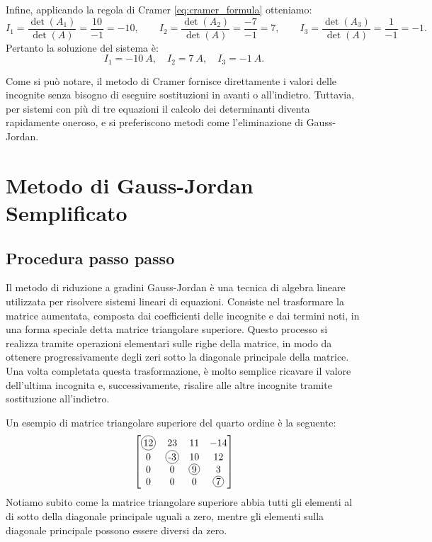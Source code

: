 Infine, applicando la regola di Cramer \eqref{eq:cramer_formula} otteniamo:
\begin{equation}
I_1 = \frac{\det(A_1)}{\det(A)} = \frac{10}{-1} = -10,\qquad
I_2 = \frac{\det(A_2)}{\det(A)} = \frac{-7}{-1} = 7,\qquad
I_3 = \frac{\det(A_3)}{\det(A)} = \frac{1}{-1} = -1. \label{eq:soluzione_3x3}
\end{equation}
Pertanto la soluzione del sistema è:
\begin{equation}
I_1 = \SI{-10}{A},\quad I_2 = \SI{7}{A},\quad I_3 = \SI{-1}{A}. \label{eq:soluzione_3x2_valori}
\end{equation}

Come si può notare, il metodo di Cramer fornisce direttamente i valori delle incognite senza bisogno di eseguire sostituzioni in avanti o all'indietro. Tuttavia, per sistemi con più di tre equazioni il calcolo dei determinanti diventa rapidamente oneroso, e si preferiscono metodi come l'eliminazione di Gauss-Jordan.


\section{Metodo di Gauss-Jordan Semplificato}

\subsection{Procedura passo passo}
Il metodo di riduzione a gradini Gauss-Jordan è una tecnica di algebra lineare utilizzata per risolvere sistemi lineari di equazioni. Consiste nel trasformare la matrice aumentata, composta dai coefficienti delle incognite e dai termini noti, in una forma speciale detta matrice triangolare superiore. Questo processo si realizza tramite operazioni elementari sulle righe della matrice, in modo da ottenere progressivamente degli zeri sotto la diagonale principale della matrice. Una volta completata questa trasformazione, è molto semplice ricavare il valore dell'ultima incognita e, successivamente, risalire alle altre incognite tramite sostituzione all'indietro.

Un esempio di matrice triangolare superiore del quarto ordine è la seguente:
\begin{equation}
\begin{bmatrix}
\tikz[baseline=(char.base)]{\node[draw,circle,inner sep=1pt] (char) {12};} & 23 & 11 & -14 \\
0 & \tikz[baseline=(char.base)]{\node[draw,circle,inner sep=1pt] (char) {-3};} & 10 & 12 \\
0 & 0 & \tikz[baseline=(char.base)]{\node[draw,circle,inner sep=1pt] (char) {9};} & 3 \\
0 & 0 & 0 & \tikz[baseline=(char.base)]{\node[draw,circle,inner sep=1pt] (char) {7};}
\end{bmatrix}
\end{equation}
Notiamo subito come la matrice triangolare superiore abbia tutti gli elementi al di sotto della diagonale principale uguali a zero, mentre gli elementi sulla diagonale principale possono essere diversi da zero.

